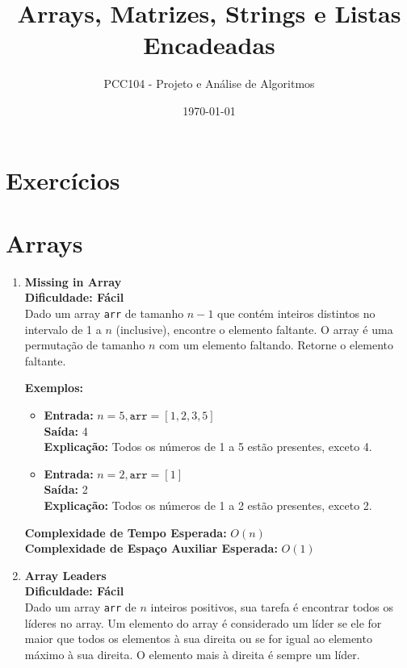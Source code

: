 \documentclass[a4paper,12pt]{article}
\begin{document}
\title{Arrays, Matrizes, Strings e Listas Encadeadas}
\author{PCC104 - Projeto e Análise de Algoritmos}
\date{\today}

\maketitle

\section*{Exercícios}

\section{Arrays}

\begin{enumerate}

    \item \textbf{Missing in Array} \\
    \textbf{Dificuldade: Fácil} \\
    Dado um array \texttt{arr} de tamanho \( n-1 \) que contém inteiros distintos no intervalo de 1 a \( n \) (inclusive), encontre o elemento faltante. O array é uma permutação de tamanho \( n \) com um elemento faltando. Retorne o elemento faltante.

    \textbf{Exemplos:}
    \begin{itemize}
        \item \textbf{Entrada:} \( n = 5, \texttt{arr} = [1,2,3,5] \) \\
        \textbf{Saída:} 4 \\
        \textbf{Explicação:} Todos os números de 1 a 5 estão presentes, exceto 4.
        
        \item \textbf{Entrada:} \( n = 2, \texttt{arr} = [1] \) \\
        \textbf{Saída:} 2 \\
        \textbf{Explicação:} Todos os números de 1 a 2 estão presentes, exceto 2.
    \end{itemize}
    
    \textbf{Complexidade de Tempo Esperada:} \( O(n) \) \\
    \textbf{Complexidade de Espaço Auxiliar Esperada:} \( O(1) \)

    \item \textbf{Array Leaders} \\
    \textbf{Dificuldade: Fácil} \\
    Dado um array \texttt{arr} de \( n \) inteiros positivos, sua tarefa é encontrar todos os líderes no array. Um elemento do array é considerado um líder se ele for maior que todos os elementos à sua direita ou se for igual ao elemento máximo à sua direita. O elemento mais à direita é sempre um líder.


\end{enumerate}
\end{document}
